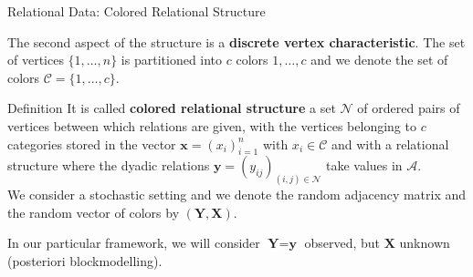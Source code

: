 \documentclass[aspectratio=169,xcolor=dvipsnames]{beamer}
\newcommand{\setn}{\mathcal{N}}
\newcommand{\seta}{\mathcal{A}}
\newcommand{\setc}{\mathcal{C}}
\newcommand{\vecx}{\textbf{x}}
\newcommand{\vecy}{\textbf{y}}
\newcommand{\matx}{\textbf{X}}
\newcommand{\maty}{\textbf{Y}}
\begin{document}
\begin{frame}{{Relational Data: Colored Relational Structure}}

The second aspect of the structure is a \textbf{discrete vertex characteristic}. The set of vertices $\{1, \dots ,n\}$ is partitioned into $c$ colors $1, \dots, c$ and we denote the set of colors $\setc = \{1, \dots ,c\}$.

\vspace{5pt}
\begin{block}{Definition}
It is called \textbf{colored relational structure} a set $\setn$ of ordered pairs of vertices between which relations are given, with the vertices belonging to $c$ categories stored in the vector $\vecx = (x_i)^n_{i=1}$ with $x_i \in \setc$ and with a relational structure where the dyadic relations $\vecy = (y_{ij})_{(i,j) \in \setn}$ take values in $\seta$.\\
 We consider a stochastic setting and we denote the random adjacency matrix and the random vector of colors by $(\maty, \matx)$.
\end{block}

\vspace{5pt}
In our particular framework,  we will consider $\maty = \vecy$ observed, but $\matx$ unknown (posteriori blockmodelling).

\end{frame}

\end{document}
